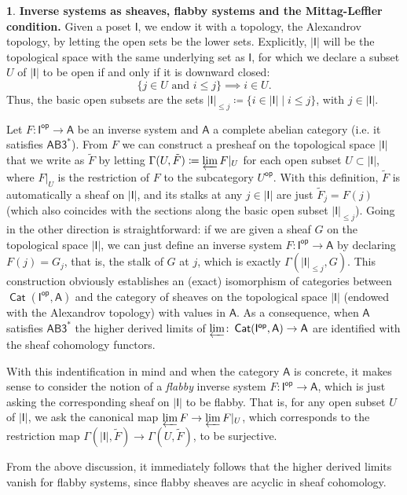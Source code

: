 \documentclass[reqno,11pt]{amsart}
\theoremstyle{plain}
\theoremstyle{remark}
\theoremstyle{definition}
\newtheorem{cosa}[thm]{}
\numberwithin{equation}{thm}
\newcommand{\SA}{\mathsf{A}}
\newcommand{\SI}{\mathsf{I}}
\newcommand{\op}{\mathsf{op}}
\DeclareMathOperator{\cat}{\mathsf{Cat}}
\begin{document}
	\begin{cosa}\label{flabby-systems}
		\textbf{Inverse systems as sheaves, flabby systems and the Mittag-Leffler condition.}
		Given a poset $\SI$, we endow it with a topology, the Alexandrov topology, by letting the open sets be the lower sets. Explicitly, $|\SI|$ will be the topological space with the same underlying set as $\SI$, for which we declare a subset $U$ of $|\SI|$ to be open if and only if it is downward closed:
		\[ 
			\{j \in U \text{ and } i \leq j\} \implies i \in U. 
		\]
		Thus, the basic open subsets are the sets $|\SI|_{\leq j} \coloneqq \{i \in |\SI| \mid i \leq j\}$, with $j \in |\SI|$.
		
		Let $F \colon \SI^\op \to \SA$ be an inverse system and $\SA$ a complete abelian category (i.e. it satisfies $\mathsf{AB3^*}$). From $F$ we can construct a presheaf on the topological space $|\SI|$ that we write as $\tilde{F}$ by letting $\Gamma(U, \tilde{F}) \coloneqq \varprojlim F\vert_U$ for each open subset $U \subset |\SI|$, where $F\vert_U$ is the restriction of $F$ to the subcategory $U^\op$. With this definition, $\tilde{F}$ is automatically a sheaf on $|\SI|$, and its stalks at any $j \in |\SI|$ are just $\tilde{F}_{j} = F(j)$ (which also coincides with the sections along the basic open subset $|\SI|_{\leq j}$). Going in the other direction is straightforward: if we are given a sheaf $G$ on the topological space $|\SI|$, we can just define an inverse system $F \colon \SI^\op \to \SA$ by declaring $F(j)= G_{j}$, that is, the stalk of $G$ at $j$, which is exactly $\Gamma(|\SI|_{\leq j},G)$. This construction obviously establishes an (exact) isomorphism of categories between $\cat(\SI^\op, \SA)$ and the category of sheaves on the topological space $|\SI|$ (endowed with the Alexandrov topology) with values in $\SA$. As a consequence, when $\SA$ satisfies $\mathsf{AB3^*}$ the higher derived limits of $\varprojlim \colon \cat(\SI^\op, \SA) \to \SA$ are identified with the sheaf cohomology functors. 
		
		With this indentification in mind and when the category $\SA$ is concrete, it makes sense to consider the notion of a \textit{flabby} inverse system $F \colon \SI^\op \to \SA$, which is just asking the corresponding sheaf on $|\SI|$ to be flabby. That is, for any open subset $U$ of $|\SI|$, we ask the canonical map $\varprojlim F \to \varprojlim F\vert_U$, which corresponds to the restriction map $\Gamma(|\SI|, \tilde{F}) \to \Gamma(U, \tilde{F})$, to be surjective. 
	
		From the above discussion, it immediately follows that the higher derived limits vanish for flabby systems, since flabby sheaves are acyclic in sheaf cohomology.
		

\end{cosa}
\end{document}
